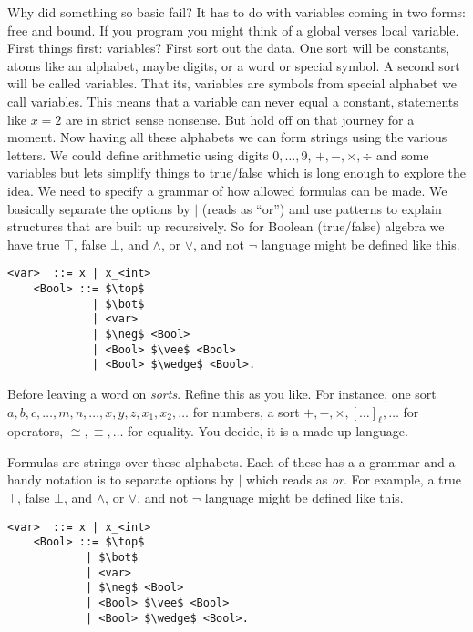 Why did something so basic fail?  It has to do with variables coming in 
two forms: free and bound.  If you program you might think of a global 
verses local variable.  First things first: variables?
First sort out the data.  One sort will be constants, atoms like an alphabet,
maybe digits, or a word or special symbol. A second sort will be called variables.
That its, variables are symbols from special alphabet we call variables.
This means that a variable can never equal a constant, statements like $x=2$ 
are in strict sense nonsense.  But hold off on that journey for a moment.
Now having all these alphabets we can form strings using the various letters.
We could define arithmetic using digits $0,\ldots, 9$, $+,-,\times,\div$ and some 
variables but lets simplify things to true/false which is long enough to 
explore the idea.  We need to specify a grammar of how allowed formulas can 
be made.  We basically separate the options by $\mid$ (reads as ``or'')
and use patterns to explain structures that are built up recursively.
So for Boolean (true/false) algebra we have true $\top$, false $\bot$, 
and $\wedge$, or $\vee$, and not $\neg$ language might be defined like this.
\newpage    
\begin{lstfloat}
\begin{lstlisting}[mathescape]
    <var>  ::= x | x_<int>
    <Bool> ::= $\top$ 
             | $\bot$ 
             | <var>
             | $\neg$ <Bool> 
             | <Bool> $\vee$ <Bool> 
             | <Bool> $\wedge$ <Bool>.
\end{lstlisting}
\end{lstfloat}




Before leaving a word on \emph{sorts}.
Refine this as you like. For instance, one sort $a,b,c,\ldots,m,n,\dots, x,y,z,
x_1,x_2,\ldots$ for numbers, a sort $+,-,\times, [\ldots]_{\ell},\ldots$ for
operators, $\cong, \equiv, \ldots$ for equality.  You decide, it is a made up 
language.



  Formulas are strings over these alphabets.  Each of these has a 
a grammar and a handy notation is 
to separate options by $\mid$ which reads as \emph{or}.  For example, 
a true $\top$, false $\bot$, and $\wedge$, or $\vee$, and not $\neg$ language might be defined like this.
\newpage    
\begin{lstfloat}
\begin{lstlisting}[mathescape]
    <var>  ::= x | x_<int>
    <Bool> ::= $\top$ 
            | $\bot$ 
            | <var>
            | $\neg$ <Bool> 
            | <Bool> $\vee$ <Bool> 
            | <Bool> $\wedge$ <Bool>.
\end{lstlisting}
\end{lstfloat}

